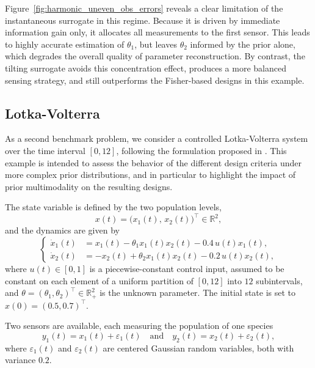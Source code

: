 \documentclass[a4paper,11pt]{article}
\begin{document}
Figure~\ref{fig:harmonic_uneven_obs_errors} reveals a clear limitation of the instantaneous surrogate in this regime. Because it is driven by immediate information gain only, it allocates  all measurements to the first sensor. This leads to highly accurate estimation of \(\theta_1\), but leaves \(\theta_2\) informed by the prior alone, which degrades the overall quality of parameter reconstruction.  By contrast, the tilting surrogate avoids this concentration effect, produces a more balanced sensing strategy, and still outperforms the Fisher-based designs in this example.

\subsection{Lotka-Volterra}

As a second benchmark problem, we consider a controlled Lotka-Volterra system over the time interval \([0,12]\), following the formulation proposed in \cite{Sager2006,Plate2026}. This example is intended to assess the behavior of the different design criteria under more complex prior distributions, and in particular to highlight the impact of prior multimodality on the resulting designs.

The state variable is defined by the two population levels,
\[
x(t)=\bigl(x_1(t),\,x_2(t)\bigr)^\top \in \mathbb{R}^2,
\]
and the dynamics are given by
\begin{equation}
\left\{
\begin{aligned}
\dot{x}_1(t) &= x_1(t) - \theta_1 x_1(t)x_2(t) - 0.4\,u(t)x_1(t),\\
\dot{x}_2(t) &= -x_2(t) + \theta_2 x_1(t)x_2(t) - 0.2\,u(t)x_2(t),
\end{aligned}
\right.
\end{equation}
where \(u(t)\in[0,1]\) is a piecewise-constant control input, assumed to be constant on each element of a uniform partition of \([0,12]\) into \(12\) subintervals, and \(\theta = (\theta_1,\theta_2)^\top \in \mathbb{R}_+^2\)
is the unknown parameter. The initial state is set to
\(x(0) = (0.5, 0.7)^\top.\)


Two sensors are available, each measuring the population of one species
\begin{equation}
y_1(t) = x_1(t) + \varepsilon_{1}(t)
\quad \text{and} \quad
y_2(t) = x_2(t) + \varepsilon_{2}(t),
\end{equation}
where \(\varepsilon_{1}(t)\) and \(\varepsilon_{2}(t)\) are centered Gaussian random variables, both with variance \(0.2\).
\end{document}
